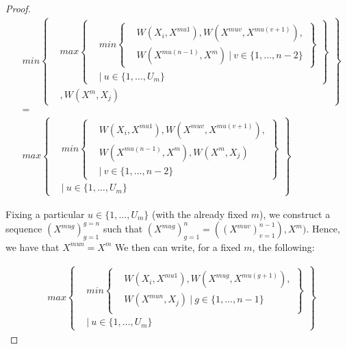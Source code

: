 \documentclass{article} %
\begin{document}
\begin{proof}
\[
\begin{aligned}
&min
      \left\{
      \begin{aligned}
        &max
          \left\{
          \begin{aligned}
            &min\left\{
            \begin{aligned}
            &W(X_i,X^{mu1}), W(X^{muv},X^{mu(v+1)}), \\
            &W(X^{mu(n-1)},X^m)\ |\ v\in\{1,\ldots,n-2\}
            \end{aligned}
            \right\} \\
            &|\ u\in\{1,\ldots,U_m\}
          \end{aligned}
          \right\} \\
          &, W(X^m,X_j)
      \end{aligned}
      \right\} \\
      &= \\
&max
          \left\{
          \begin{aligned}
            &min\left\{
            \begin{aligned}
            &W(X_i,X^{mu1}), W(X^{muv},X^{mu(v+1)}), \\
            &W(X^{mu(n-1)},X^m), W(X^m,X_j)\ \\
            &|\ v\in\{1,\ldots,n-2\}
            \end{aligned}
            \right\} \\
            &|\ u\in\{1,\ldots,U_m\}
          \end{aligned}
          \right\}
\end{aligned}
\]

Fixing a particular $u\in\{1,\ldots,U_m\}$ (with the already fixed $m$), we construct a sequence $(X^{mug})_{g=1}^{g=n}$ such that $(X^{mug})_{g=1}^n=((X^{muv})_{v=1}^{n-1}),X^m)$. Hence, we have that $X^{mun}=X^m$ We then can write, for a fixed $m$, the following:

\[
\begin{aligned}
&max
          \left\{
          \begin{aligned}
            &min\left\{
            \begin{aligned}
            &W(X_i,X^{mu1}), W(X^{mug},X^{mu(g+1)}), \\
            &W(X^{mun},X_j)\ |\ g\in\{1,\ldots,n-1\}\\
            \end{aligned}
            \right\} \\
            &|\ u\in\{1,\ldots,U_m\}
          \end{aligned}
          \right\}
\end{aligned}
\]




\end{proof}
\end{document}
